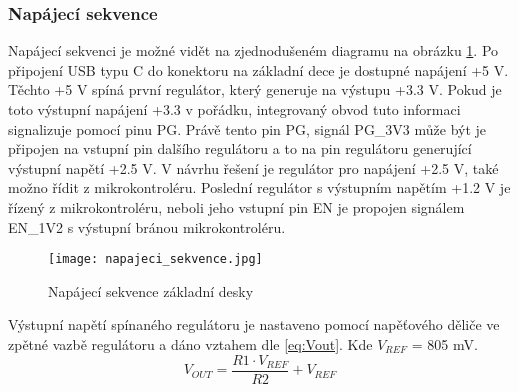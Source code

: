 	\subsubsection{Napájecí sekvence}
	Napájecí sekvenci je možné vidět na zjednodušeném diagramu na obrázku \ref{fig:napajeci_sekvecne}. Po připojení USB typu C do konektoru na základní dece je dostupné napájení +5 V. Těchto +5 V spíná první regulátor, který generuje na výstupu +3.3 V. Pokud je toto výstupní napájení +3.3 v pořádku, integrovaný obvod tuto informaci signalizuje pomocí pinu PG. Právě tento pin PG, signál PG\_3V3 může být je připojen na vstupní pin dalšího regulátoru a to na pin regulátoru generující výstupní napětí +2.5 V. V návrhu řešení je regulátor pro napájení +2.5 V, také možno řídit z mikrokontroléru. Poslední regulátor s výstupním napětím +1.2 V je řízený z mikrokontroléru, neboli jeho vstupní pin EN je propojen signálem EN\_1V2 s výstupní bránou mikrokontroléru.
	\begin{figure}[h!]
		\centering
		\captionsetup{justification=centering}
		\texttt{[image: napajeci\_sekvence.jpg]}
		\caption{Napájecí sekvence základní desky} 
		\label{fig:napajeci_sekvecne}
	\end{figure}
	\par Výstupní napětí spínaného regulátoru je nastaveno pomocí napěťového děliče ve zpětné vazbě regulátoru a dáno vztahem dle \ref{eq:Vout}. Kde $V_{REF}$ = 805 mV.
	\begin{equation}
		V_{OUT} = \frac{R1 \cdot V_{REF}}{R2} + V_{REF}
		\label{eq:Vout}
	\end{equation}

